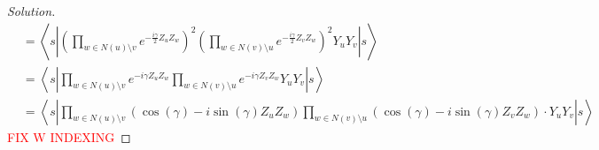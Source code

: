 \documentclass[11pt]{article}
\newenvironment{question}[2][Question]{\begin{trivlist}
\item[\hskip \labelsep {\bfseries #1}\hskip \labelsep {\bfseries #2.}]}{\end{trivlist}}
\newenvironment{solution}{\begin{proof}[Solution]}{\end{proof}}
\newcommand{\lr}[3]{\!\left#1 #3 \right#2}
\begin{document}
\begin{question}{2}
\begin{enumerate}[(a)]
\begin{solution}
\begin{align*}
                    &= \left\langle s\left|\lr(){\prod_{w\in N(u)\setminus v}e^{-\frac{i\gamma}{2}Z_uZ_w}}^2 
                    \lr(){\prod_{w\in N(v)\setminus u}e^{-\frac{i\gamma}{2}Z_vZ_w}}^2 Y_uY_v \right|s\right\rangle \\
                    &= \left\langle s\left|\prod_{w\in N(u)\setminus v}e^{-i\gamma Z_uZ_w}
                    \prod_{w\in N(v)\setminus u}e^{-i\gamma Z_vZ_w} Y_uY_v \right|s\right\rangle \\
                    &= \left\langle s\left|\prod_{w\in N(u)\setminus v}(\cos(\gamma)-i\sin(\gamma)Z_uZ_w)
                    \prod_{w\in N(v)\setminus u}(\cos(\gamma)-i\sin(\gamma)Z_vZ_w)\cdot Y_uY_v \right|s\right\rangle
                \end{align*}
                \textcolor{red}{FIX W INDEXING}
                

\end{solution}
\end{enumerate}
\end{question}
\end{document}
